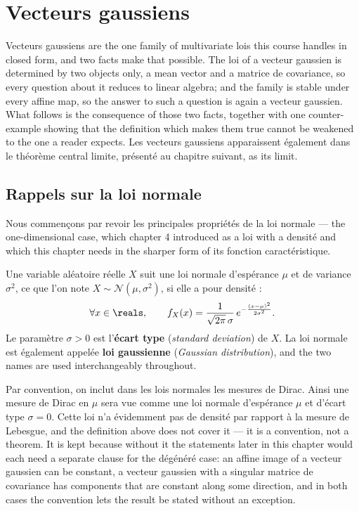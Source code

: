 \section{Vecteurs gaussiens}

Vecteurs gaussiens are the one family of multivariate lois this course
handles in closed form, and two facts make that possible. The loi of a vecteur
gaussien is determined by two objects only, a mean vector and a matrice de
covariance, so every question about it reduces to linear algebra; and the family is
stable under every affine map, so the answer to such a question is again a
vecteur gaussien. What follows is the consequence of those two facts, together
with one counter-example showing that the definition which makes them true
cannot be weakened to the one a reader expects. Les vecteurs gaussiens
apparaissent également dans le théorème central limite, présenté au chapitre
suivant, as its limit.

\subsection{Rappels sur la loi normale}

Nous commençons par revoir les principales propriétés de la loi normale --- the
one-dimensional case, which chapter 4 introduced as a loi with a densité and
which this chapter needs in the sharper form of its fonction caractéristique.

\begin{definition}
Une variable aléatoire réelle $X$ suit une loi normale d'espérance $\mu$ et de
variance $\sigma^{2}$, ce que l'on note $X \sim \mathcal{N}(\mu,\sigma^{2})$, si
elle a pour densité :
\[
  \forall x \in \reals, \qquad
  f_{X}(x) = \frac{1}{\sqrt{2\pi}\,\sigma}\,
             e^{-\frac{(x-\mu)^{2}}{2\sigma^{2}}} .
\]
Le paramètre $\sigma > 0$ est l'\textbf{écart type}
(\textit{standard deviation}) de $X$. La loi normale est également appelée
\textbf{loi gaussienne} (\textit{Gaussian distribution}), and the two names are
used interchangeably throughout.
\end{definition}

\begin{notation}
Par convention, on inclut dans les lois normales les mesures de Dirac. Ainsi une
mesure de Dirac en $\mu$ sera vue comme une loi normale d'espérance $\mu$ et
d'écart type $\sigma = 0$. Cette loi n'a évidemment pas de densité par rapport
à la mesure de Lebesgue, and the definition above does not cover
it --- it is a convention, not a theorem. It is kept because without it the
statements later in this chapter would each need a separate clause for the
dégénéré case: an affine image of a vecteur gaussien can be constant, a vecteur
gaussien with a singular matrice de covariance has components that are constant
along some direction, and in both cases the convention lets the result be stated
without an exception.
\end{notation}

